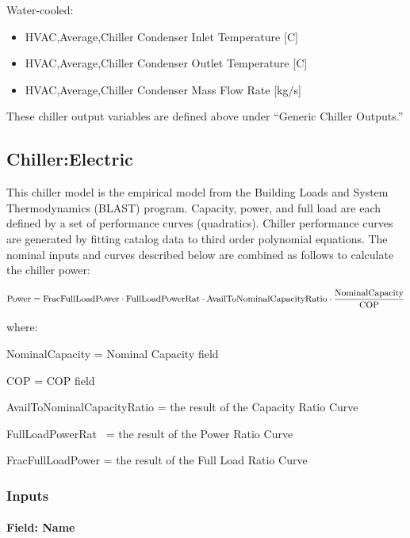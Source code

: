 Water-cooled:

\begin{itemize}
    \item
    HVAC,Average,Chiller Condenser Inlet Temperature {[}C{]}
    \item
    HVAC,Average,Chiller Condenser Outlet Temperature {[}C{]}
    \item
    HVAC,Average,Chiller Condenser Mass Flow Rate {[}kg/s{]}
\end{itemize}

These chiller output variables are defined above under ``Generic Chiller Outputs.''

\subsection{Chiller:Electric}\label{chillerelectric}

This chiller model is the empirical model from the Building Loads and System Thermodynamics (BLAST) program. Capacity, power, and full load are each defined by a set of performance curves (quadratics). Chiller performance curves are generated by fitting catalog data to third order polynomial equations. The nominal inputs and curves described below are combined as follows to calculate the chiller power:

\begin{equation}
{\rm{Power  =  FracFullLoadPower }}
    \cdot {\rm{ FullLoadPowerRat }}\cdot {\rm{ AvailToNominalCapacityRatio }}\cdot \frac{{{\rm{NominalCapacity}}}}{{{\rm{COP}}}}
\end{equation}

where:

NominalCapacity = Nominal Capacity field

COP = COP field

AvailToNominalCapacityRatio = the result of the Capacity Ratio Curve

FullLoadPowerRat~ = the result of the Power Ratio Curve

FracFullLoadPower = the result of the Full Load Ratio Curve

\subsubsection{Inputs}\label{inputs-3-026}

\paragraph{Field: Name}\label{field-name-3-023}


